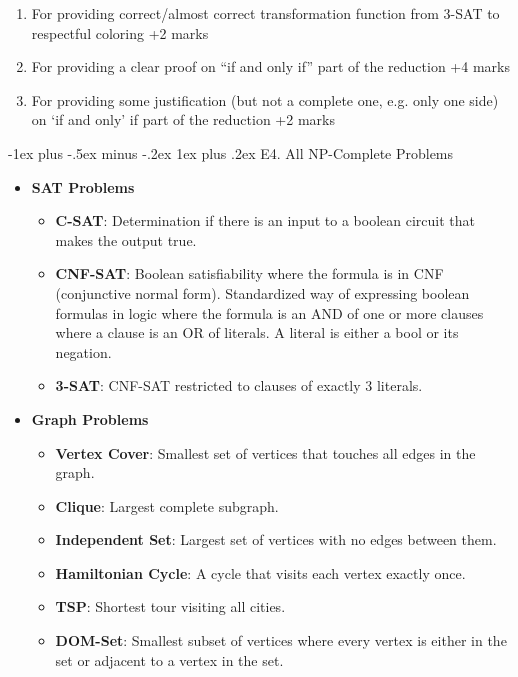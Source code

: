 \documentclass[10pt,landscape]{article}
\makeatletter
\newcommand{\subsubsubsection}{\@startsection{subsubsection}{3}{0mm}%
                                {-1ex plus -.5ex minus -.2ex}%
                                {1ex plus .2ex}%
                                {\normalfont\scriptsize\bfseries}}
\newcommand{\1}{\mathmybb{1}}
\makeatother
\begin{document}
\begin{multicols*}{3}
\begin{enumerate}[topsep=0pt,noitemsep,wide=0pt, leftmargin=\dimexpr\labelwidth + 2\labelsep\relax]
  \item For providing correct/almost correct transformation function from 3-SAT to respectful coloring +2 marks
  \item For providing a clear proof on “if and only if” part of the reduction +4 marks
  \item For providing some justification (but not a complete one, e.g. only one side) on `if and only' if part of the reduction +2 marks
\end{enumerate}

\subsubsubsection{E4. All NP-Complete Problems}
\begin{itemize}[topsep=0pt,noitemsep,wide=0pt, leftmargin=\dimexpr{} + 2\relax]
  \item \textbf{SAT Problems}
  \begin{itemize}[topsep=0pt,noitemsep,wide=0pt, leftmargin=\dimexpr{} + 2\relax]
      \item \textbf{C-SAT}: Determination if there is an input to a boolean circuit that makes the output true.
      \item \textbf{CNF-SAT}: Boolean satisfiability where the formula is in CNF (conjunctive normal form). Standardized way of expressing boolean formulas in logic where the formula is an AND of one or more clauses where a clause is an OR of literals. A literal is either a bool or its negation.
      \item \textbf{3-SAT}: CNF-SAT restricted to clauses of exactly 3 literals.
  \end{itemize}
  \item \textbf{Graph Problems}
  \begin{itemize}[topsep=0pt,noitemsep,wide=0pt, leftmargin=\dimexpr{} + 2\relax]
      \item \textbf{Vertex Cover}: Smallest set of vertices that touches all edges in the graph.
      \item \textbf{Clique}: Largest complete subgraph.
      \item \textbf{Independent Set}: Largest set of vertices with no edges between them.
      \item \textbf{Hamiltonian Cycle}: A cycle that visits each vertex exactly once.
      \item \textbf{TSP}: Shortest tour visiting all cities.
      \item \textbf{DOM-Set}: Smallest subset of vertices where every vertex is either in the set or adjacent to a vertex in the set.

\end{itemize}
\end{itemize}
\end{multicols*}
\end{document}
